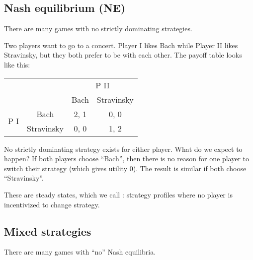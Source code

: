 \documentclass[12pt,letterpaper]{report}
\begin{document}
\pagebreak
\subsection{Nash equilibrium (NE)}

There are many games with no strictly dominating strategies.

\begin{ex}
  Two players want to go to a concert.
  Player I likes Bach while Player II likes Stravinsky, but they both prefer to be with each other.
  The payoff table looks like this:

  \begin{center}
    \renewcommand{\arraystretch}{1.25}
    \begin{tabular}{c c |c|c|}
      \multicolumn{2}{c}{} & \multicolumn{2}{c}{P II} \\
      \multicolumn{2}{c}{} & \multicolumn{1}{c}{Bach} & \multicolumn{1}{c}{Stravinsky} \\
      \cline{3-4}
      \multirow{2}{*}{P I} & Bach & 2, 1 & 0, 0 \\
      \cline{3-4}
      & Stravinsky & 0, 0 & 1, 2 \\
      \cline{3-4}
    \end{tabular}
  \end{center}

  No strictly dominating strategy exists for either player.
  What do we expect to happen?
  If both players choose ``Bach'', then there is no reason for one player to switch their strategy
  (which gives utility 0).
  The result is similar if both choose ``Stravinsky''.
\end{ex}

These are steady states, which we call : strategy profiles where no player
is incentivized to change strategy.

\subsection{Mixed strategies}

There are many games with ``no'' Nash equilibria.
\end{document}
